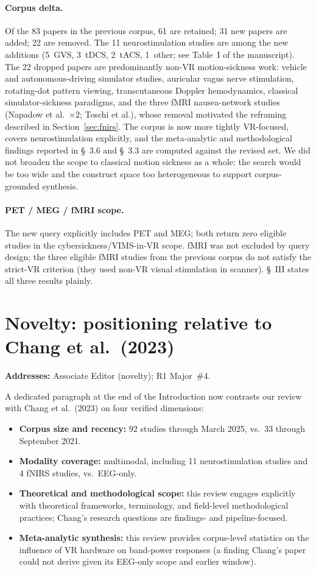 \documentclass[11pt,a4paper]{article}
\newcommand{\addresses}[1]{\par\noindent\textbf{\small Addresses:} {\small #1}\par\smallskip}
\begin{document}
\paragraph{Corpus delta.} Of the 83 papers in the previous corpus, 61 are retained; 31 new papers are added; 22 are removed. The 11 neurostimulation studies are among the new additions (5~GVS, 3~tDCS, 2~tACS, 1~other; see Table~I of the manuscript). The 22 dropped papers are predominantly non-VR motion-sickness work: vehicle and autonomous-driving simulator studies, auricular vagus nerve stimulation, rotating-dot pattern viewing, transcutaneous Doppler hemodynamics, classical simulator-sickness paradigms, and the three fMRI nausea-network studies (Napadow et al.\ $\times 2$; Toschi et al.), whose removal motivated the reframing described in Section~\ref{sec:fnirs}. The corpus is now more tightly VR-focused, covers neurostimulation explicitly, and the meta-analytic and methodological findings reported in \S~3.6 and \S~3.3 are computed against the revised set. We did not broaden the scope to classical motion sickness as a whole: the search would be too wide and the construct space too heterogeneous to support corpus-grounded synthesis.

\paragraph{PET / MEG / fMRI scope.} The new query explicitly includes PET and MEG; both return zero eligible studies in the cybersickness/VIMS-in-VR scope. fMRI was not excluded by query design; the three eligible fMRI studies from the previous corpus do not satisfy the strict-VR criterion (they used non-VR visual stimulation in scanner). \S~III states all three results plainly.

\section{Novelty: positioning relative to Chang et al.\ (2023)}\label{sec:novelty}
\addresses{Associate Editor (novelty); R1 Major~\#4.}

A dedicated paragraph at the end of the Introduction now contrasts our review with Chang et al.\ (2023) on four verified dimensions:
\begin{itemize}
  \item \textbf{Corpus size and recency:} 92 studies through March 2025, vs.\ 33 through September 2021.
  \item \textbf{Modality coverage:} multimodal, including 11 neurostimulation studies and 4 fNIRS studies, vs.\ EEG-only.
  \item \textbf{Theoretical and methodological scope:} this review engages explicitly with theoretical frameworks, terminology, and field-level methodological practices; Chang's research questions are findings- and pipeline-focused.
  \item \textbf{Meta-analytic synthesis:} this review provides corpus-level statistics on the influence of VR hardware on band-power responses (a finding Chang's paper could not derive given its EEG-only scope and earlier window).
\end{itemize}
\end{document}
